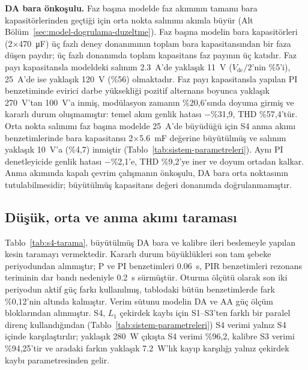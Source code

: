 \textbf{DA bara önkoşulu.} Faz başına modelde faz akımının tamamı bara kapasitörlerinden geçtiği için orta nokta salınımı akımla büyür (Alt Bölüm~\ref{sec:model-dogrulama-duzeltme}). Faz başına modelin bara kapasitörleri (2$\times$\SI{470}{\micro\farad}) üç fazlı deney donanımının toplam bara kapasitansından bir faza düşen paydır; üç fazlı donanımda toplam kapasitans faz payının üç katıdır. Faz payı kapasitansla modeldeki salınım \SI{2.3}{\ampere}'de yaklaşık \SI{11}{\volt} ($V_{\mathrm{dc}}/2$'nin \%5'i), \SI{25}{\ampere}'de ise yaklaşık \SI{120}{\volt} (\%56) olmaktadır. Faz payı kapasitansla yapılan PI benzetiminde evirici darbe yüksekliği pozitif alternans boyunca yaklaşık \SI{270}{\volt}'tan \SI{100}{\volt}'a inmiş, modülasyon zamanın \%20,6'sında doyuma girmiş ve kararlı durum oluşmamıştır: temel akım genlik hatası $-$\%31,9, THD \%57,4'tür. Orta nokta salınımı faz başına modelde \SI{25}{\ampere}'de büyüdüğü için S4 anma akımı benzetimlerinde bara kapasitansı 2$\times$\SI{5.6}{\milli\farad} değerine büyütülmüş ve salınım yaklaşık \SI{10}{\volt}'a (\%4,7) inmiştir (Tablo~\ref{tab:sistem-parametreleri}). Aynı PI denetleyicide genlik hatası $-$\%2,1'e, THD \%9,2'ye iner ve doyum ortadan kalkar. Anma akımında kapalı çevrim çalışmanın önkoşulu, DA bara orta noktasının tutulabilmesidir; büyütülmüş kapasitans değeri donanımda doğrulanmamıştır.

\subsection{Düşük, orta ve anma akımı taraması}

Tablo~\ref{tab:s4-tarama}, büyütülmüş DA bara ve kalibre ileri beslemeyle yapılan kesin taramayı vermektedir. Kararlı durum büyüklükleri son tam şebeke periyodundan alınmıştır; P ve PI benzetimleri \SI{0.06}{\second}, PIR benzetimleri rezonans teriminin dar bandı nedeniyle \SI{0.2}{\second} sürmüştür. Oturma ölçütü olarak son iki periyodun aktif güç farkı kullanılmış, tablodaki bütün benzetimlerde fark \%0,12'nin altında kalmıştır. Verim sütunu modelin DA ve AA güç ölçüm bloklarından alınmıştır. S4, $L_1$ çekirdek kaybı için S1--S3'ten farklı bir paralel direnç kullandığından (Tablo~\ref{tab:sistem-parametreleri}) S4 verimi yalnız S4 içinde karşılaştırılır; yaklaşık \SI{280}{\watt} çıkışta S4 verimi \%96,2, kalibre S3 verimi \%94,25'tir ve aradaki farkın yaklaşık \SI{7.2}{\watt}'lık kayıp karşılığı yalnız çekirdek kaybı parametresinden gelir.

